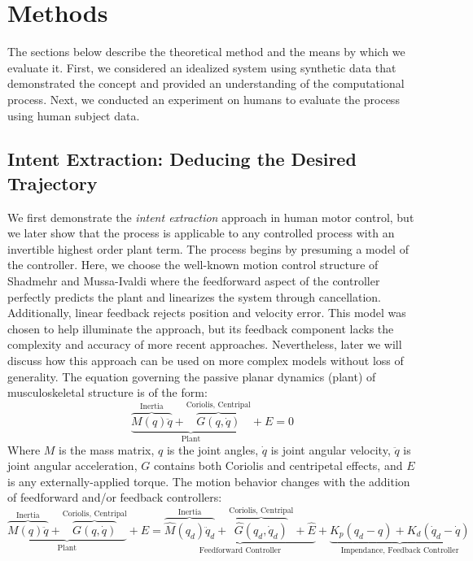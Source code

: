 \documentclass[10pt]{article}
\begin{document}

\section*{Methods}
The sections below describe the theoretical method and the means by which we evaluate it. First, we considered an idealized system using synthetic data that demonstrated the concept and provided an understanding of the computational process. Next, we conducted an experiment on humans to evaluate the process using human subject data. 

\subsection*{Intent Extraction: Deducing the Desired Trajectory}
We first demonstrate the \textit{intent extraction} approach in human motor control, but we later show that the process is applicable to any controlled process with an invertible highest order plant term. The process begins by presuming a model of the controller. Here, we choose the well-known motion control structure of Shadmehr and Mussa-Ivaldi\cite{shadmehr1994adaptive} where the feedforward aspect of the controller perfectly predicts the plant and linearizes the system through cancellation. Additionally, linear feedback rejects position and velocity error. This model was chosen to help illuminate the approach, but its feedback component lacks the complexity and accuracy of more recent approaches. Nevertheless, later we will discuss how this approach can be used on more complex models without loss of generality. The equation governing the passive planar dynamics (plant) of musculoskeletal structure is of the form:
\begin{equation}
\underbrace{\overbrace{M(q)\ddot{q}}^{\text{Inertia}}+\overbrace{G(q,\dot{q})}^{\text{Coriolis, Centripal}}}_{\text{Plant}}+E=0
\end{equation}
Where $M$ is the mass matrix, $q$ is the joint angles, $\dot{q}$ is joint angular velocity, $\ddot{q}$ is joint angular acceleration, $G$ contains both Coriolis and centripetal effects, and $E$ is any externally-applied torque. The motion behavior changes with the addition of feedforward and/or feedback controllers:
\begin{equation}
\underbrace{\overbrace{M(q)\ddot{q}}^{\text{Inertia}}+\overbrace{G(q,\dot{q})}^{\text{Coriolis, Centripal}}}_{\text{Plant}}+E=\underbrace{\overbrace{\hat{M}(q_d)\ddot{q}_d}^{\text{Inertia}}+\overbrace{\hat{G}(q_d,\dot{q}_d)}^{\text{Coriolis, Centripal}}+\hat{E}}_{\text{Feedforward Controller}}+\underbrace{K_p(q_d-q)+K_d(\dot{q}_d-\dot{q})}_{\text{Impendance, Feedback Controller}}
\end{equation}
\end{document}
